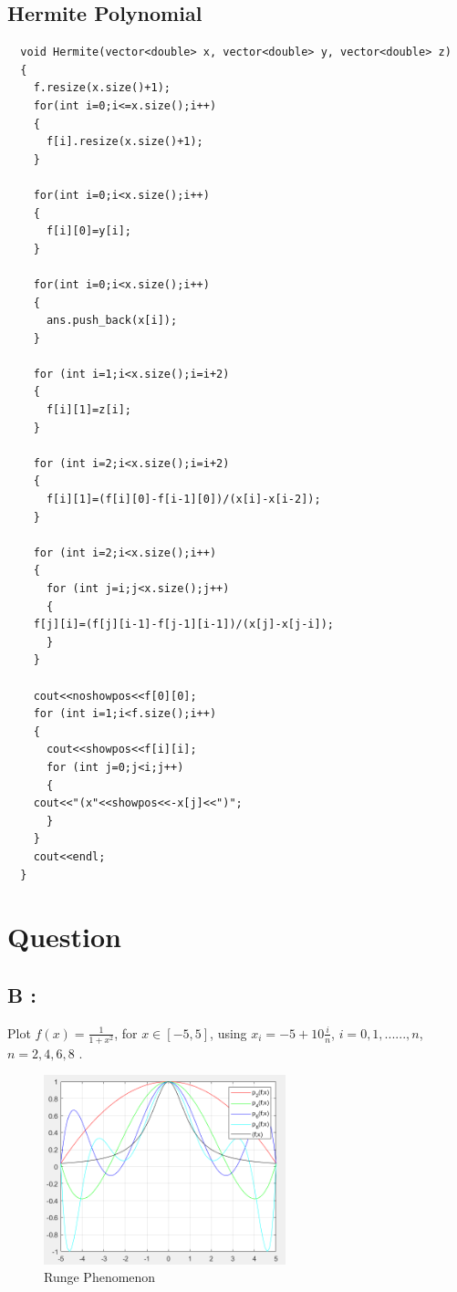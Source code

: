 \documentclass{ctexart}
\begin{document}
\subsection*{Hermite Polynomial}
\begin{verbatim}
  void Hermite(vector<double> x, vector<double> y, vector<double> z)
  {
    f.resize(x.size()+1);
    for(int i=0;i<=x.size();i++)
    {
      f[i].resize(x.size()+1);
    }
    
    for(int i=0;i<x.size();i++)
    {
      f[i][0]=y[i];
    }

    for(int i=0;i<x.size();i++)
    {
      ans.push_back(x[i]);
    }
    
    for (int i=1;i<x.size();i=i+2)
    {
      f[i][1]=z[i];
    }
    
    for (int i=2;i<x.size();i=i+2)
    {
      f[i][1]=(f[i][0]-f[i-1][0])/(x[i]-x[i-2]);
    }
    
    for (int i=2;i<x.size();i++)
    {
      for (int j=i;j<x.size();j++)
      {
	f[j][i]=(f[j][i-1]-f[j-1][i-1])/(x[j]-x[j-i]);
      }
    }

    cout<<noshowpos<<f[0][0];
    for (int i=1;i<f.size();i++)
    {
      cout<<showpos<<f[i][i];
      for (int j=0;j<i;j++)
      {
	cout<<"(x"<<showpos<<-x[j]<<")";
      }    
    }
    cout<<endl;    
  }
\end{verbatim}

\clearpage
\section*{Question}
\subsection*{B :}
\begin{flushleft}
  Plot $f(x)=\frac{1}{1+x^2}$, for $x\in[-5,5]$, using $x_i=-5+10\frac{i}{n}$, $i=0,1,......,n$, $n=2,4,6,8$ .

  \begin{figure}[H]
  \centering
    \centering
    \includegraphics[width=7cm]{1}
    \caption{Runge Phenomenon}
  \end{figure}
\end{flushleft}
\end{document}
